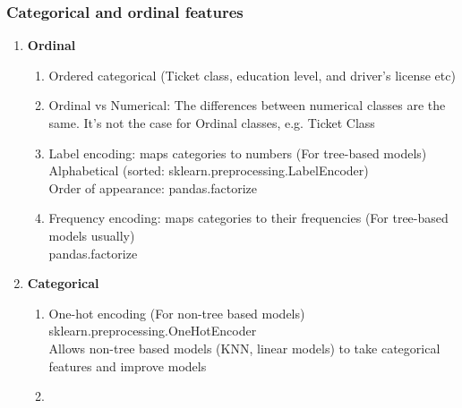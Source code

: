 \documentclass[11pt, twoside]{article}   	%
\begin{document}
\subsubsection{Categorical and ordinal features}
\renewcommand{\labelenumii}{\alph{enumii}}
\begin{enumerate}
  \item \textbf{Ordinal}
    \begin{enumerate}
      \item Ordered categorical (Ticket class, education level, and driver's license etc)
      \item Ordinal vs Numerical: The differences between numerical classes are the same. It's not the case for Ordinal classes, e.g. Ticket Class    
      \item Label encoding: maps categories to numbers (For tree-based models)
        \\\indent Alphabetical (sorted: sklearn.preprocessing.LabelEncoder)
        \\\indent Order of appearance: pandas.factorize
        
      \item Frequency encoding: maps categories to their frequencies (For tree-based models usually)
        \\\indent pandas.factorize     
    \end{enumerate}
  \item \textbf{Categorical}
    \begin{enumerate}
      \item One-hot encoding (For non-tree based models)
        \\\indent sklearn.preprocessing.OneHotEncoder
        \\\indent Allows non-tree based models (KNN, linear models) to take categorical features and improve models        
    
      \item 
    \end{enumerate}
  \end{enumerate}

%
\end{document}

